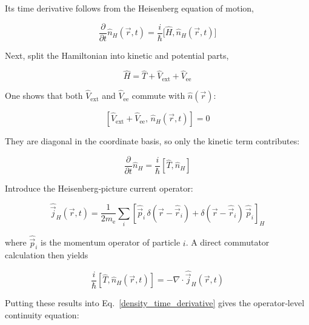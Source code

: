 Its time derivative follows from the Heisenberg equation of motion,

\begin{equation}
    \frac{\partial}{\partial t}\hat n_H(\vec{r},t)
    = \frac{i}{\hbar}\bigl[\hat H,\hat n_H(\vec{r},t)\bigr]
\label{density_time_derivative}
\end{equation}

Next, split the Hamiltonian into kinetic and potential parts,

\begin{equation}
\hat{H} = \hat{T} + \hat{V}_\mathrm{ext} + \hat{V}_\mathrm{ee}
\label{splitted_hamiltonian}
\end{equation}

One shows that both $\hat V_\mathrm{ext}$ and $\hat V_\mathrm{ee}$ commute with $\hat{n}(\vec{r})$:

\begin{equation}
    \left[\hat V_\mathrm{ext}+\hat V_\mathrm{ee},\,\hat n_H(\vec{r},t)\right] = 0
\label{commuting_potential_density}
\end{equation}

They are diagonal in the coordinate basis, so only the kinetic term contributes:

\begin{equation}
    \frac{\partial}{\partial t}\hat{n}_H
    = \frac{i}{\hbar}\left[\hat{T},\hat{n}_H\right]
\label{kinetic_term_contribution}
\end{equation}

Introduce the Heisenberg‐picture current operator:

\begin{equation}
    \hat{\vec{j}}_H(\vec{r},t)
    = \frac{1}{2m_\mathrm{e}}\sum_i\left[\hat{\vec{p}}_i\,\delta(\vec{r}-\hat\vec{r}_i)
    +\delta(\vec{r}-\hat\vec{r}_i)\,\hat\vec{p}_i\right]_H
\label{Heisenberg‐picture_current_operator}
\end{equation}

where $\hat\vec{p}_i$ is the momentum operator of particle $i$. A direct commutator calculation then yields

\begin{equation}
    \frac{i}{\hbar}\left[\hat T,\hat n_H(\vec{r},t)\right]
    = -\nabla\cdot\hat{\vec{j}}_H(\vec{r},t)
\label{direct_commutator}
\end{equation}

Putting these results into Eq.~\eqref{density_time_derivative} gives the operator‐level continuity equation:

